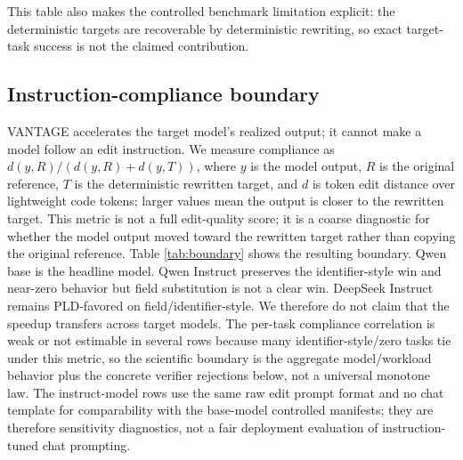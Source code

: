 \documentclass[11pt,a4paper]{article}
\begin{document}
\begin{table}[h]
\centering\scriptsize
\caption{Deterministic rewrite-engine sanity baseline on the locked controlled
manifests. This is a task-solver sanity check, not a speculative-decoding
baseline. The generated artifact includes descriptive local CPU timings, but
the main table omits them because sub-microsecond no-op timings are below a
meaningful systems-measurement scale. Generated by
\texttt{scripts/summarize\_deterministic\_rewrite\_baseline.py}.}
\label{tab:deterministic-rewrite}
\end{table}

This table also makes the controlled benchmark limitation explicit: the
deterministic targets are recoverable by deterministic rewriting, so exact
target-task success is not the claimed contribution.

\subsection{Instruction-compliance boundary}
\label{sec:boundary}

VANTAGE accelerates the target model's realized output; it cannot make
a model follow an edit instruction. We measure compliance as
$d(y,R)/(d(y,R)+d(y,T))$, where $y$ is the model output, $R$ is the
original reference, $T$ is the deterministic rewritten target, and $d$
is token edit distance over lightweight code tokens; larger values mean
the output is closer to the rewritten target. This metric is not a full
edit-quality score; it is a coarse diagnostic for whether the model output
moved toward the rewritten target rather than copying the original reference.
Table \ref{tab:boundary}
shows the resulting boundary. Qwen base is the headline model. Qwen
Instruct preserves the identifier-style win and near-zero behavior but field substitution
is not a clear win. DeepSeek Instruct remains PLD-favored on field/identifier-style.
We therefore do not claim that the speedup transfers across target
models. The per-task compliance correlation is weak or not estimable in
several rows because many identifier-style/zero tasks tie under this metric, so the
scientific boundary is the aggregate model/workload behavior plus the
concrete verifier rejections below, not a universal monotone law.
The instruct-model rows use the same raw edit prompt format and no chat
template for comparability with the base-model controlled manifests; they are
therefore sensitivity diagnostics, not a fair deployment evaluation of
instruction-tuned chat prompting.
\end{document}
